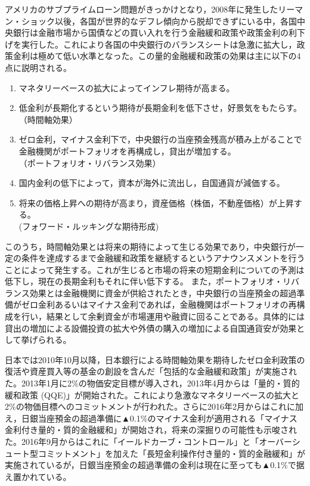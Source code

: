 \documentclass[12pt]{jarticle}
\begin{document}
{アメリカのサブプライムローン問題がきっかけとなり，2008年に発生したリーマン・ショック以後，各国が世界的なデフレ傾向から脱却できずにいる中，各国中央銀行は金融市場から国債などの買い入れを行う金融緩和政策や政策金利の利下げを実行した。これにより各国の中央銀行のバランスシートは急激に拡大し，政策金利は極めて低い水準となった。この量的金融緩和政策の効果は主に以下の4点に説明される。

\begin{enumerate}
  \setlength{\leftskip}{30pt}
  \item マネタリーベースの拡大によってインフレ期待が高まる。
  \item 低金利が長期化するという期待が長期金利を低下させ，好景気をもたらす。\\（時間軸効果）
  \item ゼロ金利，マイナス金利下で，中央銀行の当座預金残高が積み上がることで金融機関がポートフォリオを再構成し，貸出が増加する。\\（ポートフォリオ・リバランス効果）
  \item 国内金利の低下によって，資本が海外に流出し，自国通貨が減価する。
  \item 将来の価格上昇への期待が高まり，資産価格（株価，不動産価格）が上昇する。\\ (フォワード・ルッキングな期待形成)
\end{enumerate}

このうち，時間軸効果とは将来の期待によって生じる効果であり，中央銀行が一定の条件を達成するまで金融緩和政策を継続するというアナウンスメントを行うことによって発生する。これが生じると市場の将来の短期金利についての予測は低下し，現在の長期金利もそれに伴い低下する。
また，ポートフォリオ・リバランス効果とは金融機関に資金が供給されたとき，中央銀行の当座預金の超過準備がゼロ金利あるいはマイナス金利であれば，金融機関はポートフォリオの再構成を行い，結果として余剰資金が市場運用や融資に回ることである。具体的には貸出の増加による設備投資の拡大や外債の購入の増加による自国通貨安が効果として挙げられる。

日本では2010年10月以降，日本銀行による時間軸効果を期待したゼロ金利政策の復活や資産買入等の基金の創設を含んだ「包括的な金融緩和政策」が実施された。2013年1月に2\%の物価安定目標が導入され，2013年4月からは「量的・質的緩和政策 (QQE)」が開始された。これにより急激なマネタリーベースの拡大と2\%の物価目標へのコミットメントが行われた。さらに2016年2月からはこれに加え，日銀当座預金の超過準備に▲0.1\%のマイナス金利が適用される「マイナス金利付き量的・質的金融緩和」が開始され，将来の深掘りの可能性も示唆された。2016年9月からはこれに「イールドカーブ・コントロール」と「オーバーシュート型コミットメント」を加えた「長短金利操作付き量的・質的金融緩和」が実施されているが，日銀当座預金の超過準備の金利は現在に至っても▲0.1\%で据え置かれている。

}
\end{document}
